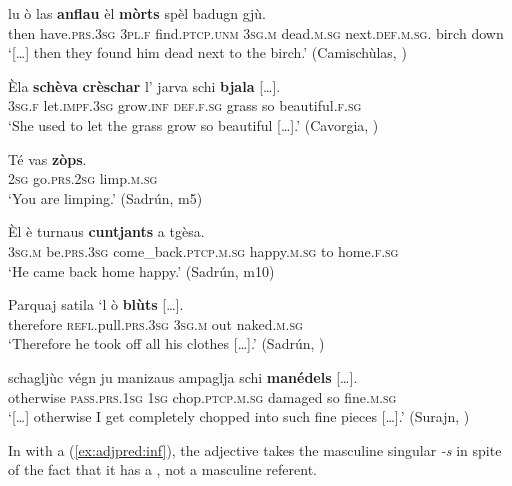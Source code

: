 \ea
\label{ex:adj.agr1}
\gll [...] lu ò las \textbf{anflau} èl \textbf{mòrts} spèl badugn gjù.\\
    {} then have.\textsc{prs.3sg} \textsc{3pl.f} find.\textsc{ptcp.unm} \textsc{3sg.m} dead.\textsc{m.sg} next.\textsc{def.m.sg}. birch down\\
\glt `[…] then they found him dead next to the birch.' (Camischùlas, \citealt[82]{Büchli1966})
\z

\ea
\label{schèwithagr}
\gll    Èla \textbf{schèva} \textbf{crèschar} l’ jarva schi \textbf{bjala} […].\\
    \textsc{3sg.f} let.\textsc{impf.3sg} grow.\textsc{inf} \textsc{def.f.sg} grass so beautiful.\textsc{f.sg} \\
\glt `She used to let the grass grow so beautiful […].' (Cavorgia, \citealt[119]{Büchli1966})
\z
 
 \ea\label{Ex:adj.agr3}
 \gll  Té vas \textbf{zòps}.\\
 \textsc{2sg} go.\textsc{prs.2sg} limp.\textsc{m.sg} \textsc{} \textsc{} \textsc{} \textsc{} \textsc{} \\
 \glt `You are limping.' (Sadrún, m5)
 \z
 
 \ea
 \label{ex:adj.agr4}
 \gll Èl è turnaus \textbf{cuntjants} a tgèsa.\\
 \textsc{3sg.m} be.\textsc{prs.3sg} come\_back.\textsc{ptcp.m.sg} happy.\textsc{m.sg} to home.\textsc{f.sg} \\
 \glt `He came back home happy.' (Sadrún, m10)
 \z
 
 \ea\label{ex:adj.agr5}
  \gll    Parquaj satila ‘l ò \textbf{blùts} […].\\
 therefore \textsc{refl}.pull.\textsc{prs.3sg} \textsc{3sg.m} out naked.\textsc{m.sg}\\
 \glt `Therefore he took off all his clothes […].' (Sadrún, \citealt[106]{Büchli1966})
 \z
 
 \ea\label{ex:adj.agr6}
 \gll    […] schagljùc végn ju manizaus ampaglja schi \textbf{manédels} […].\\
 {} otherwise \textsc{pass.prs.1sg} \textsc{1sg} chop.\textsc{ptcp.m.sg} damaged so fine.\textsc{m.sg}\\
 \glt `[…] otherwise I get completely chopped into such fine pieces […].' (Surajn, \citealt[129]{Büchli1966})
 \z
 
 In  with a  (\ref{ex:adjpred:inf}), the adjective takes the masculine singular  \textit{-s} in spite of the fact that it has a , not a masculine referent.
 
